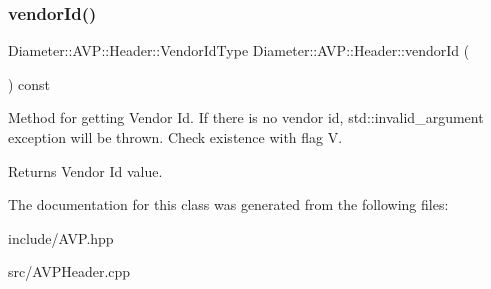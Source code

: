 \subsubsection{\texorpdfstring{vendor\+Id()}{vendorId()}}
{\footnotesize\ttfamily Diameter\+::\+A\+V\+P\+::\+Header\+::\+Vendor\+Id\+Type Diameter\+::\+A\+V\+P\+::\+Header\+::vendor\+Id (\begin{DoxyParamCaption}{ }\end{DoxyParamCaption}) const}



Method for getting Vendor Id. If there is no vendor id, std\+::invalid\+\_\+argument exception will be thrown. Check existence with flag {\ttfamily V}. 

\begin{DoxyReturn}{Returns}
Vendor Id value. 
\end{DoxyReturn}


The documentation for this class was generated from the following files\+:\begin{DoxyCompactItemize}
\item 
include/A\+V\+P.\+hpp\item 
src/A\+V\+P\+Header.\+cpp\end{DoxyCompactItemize}
